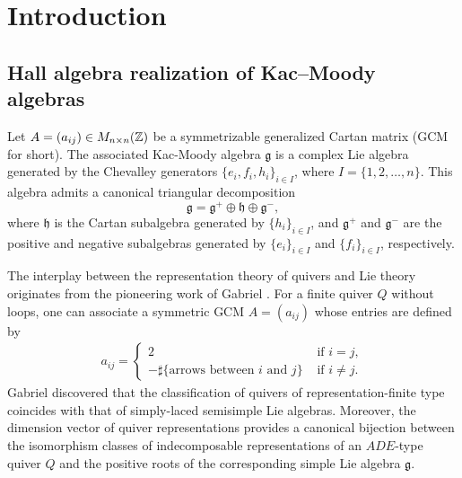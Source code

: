 \documentclass[12pt,reqno]{amsart}
\numberwithin{equation}{section}
\def \Z{{\Bbb Z}}
\begin{document}
	\pagestyle{fancy}
	\fancyhf{}
	\fancyhead[LE]{\thepage}
	\fancyhead[RO]{\thepage}
	\renewcommand{\headrulewidth}{0pt}
	
	\tableofcontents
	
	
	
	\section{Introduction}
	\subsection{Hall algebra realization of Kac--Moody algebras}
	
	Let $A=(a_{ij})\in M_{n\times n}(\Z)$ be a symmetrizable generalized Cartan matrix (GCM for short). The associated Kac-Moody algebra $\mathfrak{g}$ is a complex Lie algebra generated by the Chevalley generators $\{e_i,f_i,h_i\}_{i\in I}$, where $I=\{1,2,\dots,n\}$. This algebra admits a canonical triangular decomposition \[\mathfrak{g}=\mathfrak{g}^+\oplus \mathfrak{h}\oplus\mathfrak{g}^-,\] where $\mathfrak{h}$ is the Cartan subalgebra generated by $\{h_i\}_{i\in I}$, and $\mathfrak{g}^+$ and $\mathfrak{g}^-$ are the positive and negative subalgebras generated by $\{e_i\}_{i\in I}$ and $\{f_i\}_{i\in I}$, respectively.
	
	
	
	The interplay between the representation theory of quivers and Lie theory originates from the pioneering work of Gabriel \cite{Gab72}. 
	For a finite quiver $Q$ without loops, one can associate a symmetric GCM $A=(a_{ij})$ whose entries are defined by
	\begin{align*}
		a_{ij}=\begin{cases}
			2& \text{ if }i=j,
			\\
			-\sharp\{\text{arrows between }i \text{ and }j\}& \text{ if }i\neq j.
		\end{cases}
	\end{align*}
	Gabriel \cite{Gab72} discovered that the classification of quivers of representation-finite type coincides with that of simply-laced semisimple Lie algebras. Moreover, the dimension vector of quiver representations provides a canonical bijection between the isomorphism classes of indecomposable representations of an $ADE$-type quiver $Q$ and the positive roots of the corresponding simple Lie algebra $\mathfrak{g}$. 
	
\end{document}
